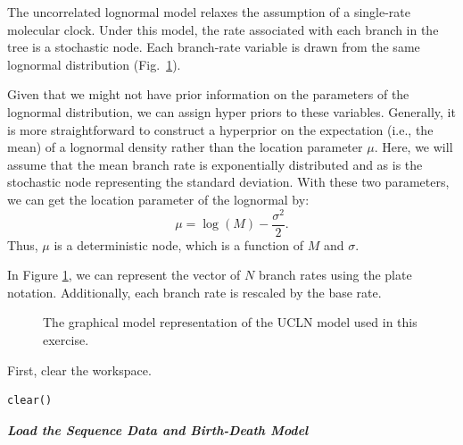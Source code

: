 The uncorrelated lognormal model relaxes the assumption of a single-rate molecular clock. 
Under this model, the rate associated with each branch in the tree is a stochastic node.
Each branch-rate variable is drawn from the same lognormal distribution (Fig.~\ref{m_UCLN:fig}).

Given that we might not have prior information on the parameters of the lognormal distribution, we can assign hyper priors to these variables. 
Generally, it is more straightforward to construct a hyperprior on the expectation (i.e., the mean) of a lognormal density rather than the location parameter $\mu$. 
Here, we will assume that the mean branch rate is exponentially distributed and as is the stochastic node representing the standard deviation.
With these two parameters, we can get the location parameter of the lognormal by:
$$\mu = \log(M) - \frac{\sigma^2}{2}.$$
Thus, $\mu$ is a deterministic node, which is a function of $M$ and $\sigma$.

In Figure \ref{m_UCLN:fig}, we can represent the vector of $N$ branch rates using the plate notation. Additionally, each branch rate is rescaled by the base rate. 
\begin{figure}[h!]
\centering
{}
\caption{\small The graphical model representation of the UCLN model used in this exercise.}
\label{m_UCLN:fig}
\end{figure}

First, clear the workspace.
{\tt \begin{snugshade*}
\begin{lstlisting}
clear()
\end{lstlisting}
\end{snugshade*}}


\textbf{\textit{Load the Sequence Data and Birth-Death Model}}

